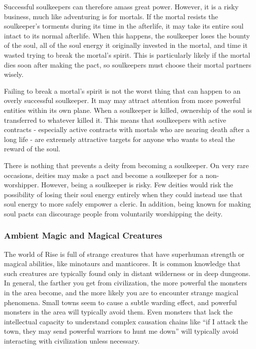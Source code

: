             Successful soulkeepers can therefore amass great power.
            However, it is a risky business, much like adventuring is for mortals.
            If the mortal resists the soulkeeper's torments during its time in the afterlife, it may take its entire soul intact to its normal afterlife.
            When this happens, the soulkeeper loses the bounty of the soul, all of the soul energy it originally invested in the mortal, and time it wasted trying to break the mortal's spirit.
            This is particularly likely if the mortal dies soon after making the pact, so soulkeepers must choose their mortal partners wisely.

            Failing to break a mortal's spirit is not the worst thing that can happen to an overly successful soulkeeper.
            It may may attract attention from more powerful entities within its own plane.
            When a soulkeeper is killed, ownership of the soul is transferred to whatever killed it.
            This means that soulkeepers with active contracts - especially active contracts with mortals who are nearing death after a long life - are extremely attractive targets for anyone who wants to steal the reward of the soul.

            There is nothing that prevents a deity from becoming a soulkeeper.
            On very rare occasions, deities may make a pact and become a soulkeeper for a non-worshipper.
            However, being a soulkeeper is risky.
            Few deities would risk the possibility of losing their soul energy entirely when they could instead use that soul energy to more safely empower a cleric.
            In addition, being known for making soul pacts can discourage people from voluntarily worshipping the deity.

        \subsubsection{Ambient Magic and Magical Creatures}
            The world of Rise is full of strange creatures that have superhuman strength or magical abilities, like minotaurs and manticores.
            It is common knowledge that such creatures are typically found only in distant wilderness or in deep dungeons.
            In general, the farther you get from civilization, the more powerful the monsters in the area become, and the more likely you are to encounter strange magical phenomena.
            Small towns seem to cause a subtle warding effect, and powerful monsters in the area will typically avoid them.
            Even monsters that lack the intellectual capacity to understand complex causation chains like ``if I attack the town, they may send powerful warriors to hunt me down'' will typically avoid interacting with civilization unless necessary.

